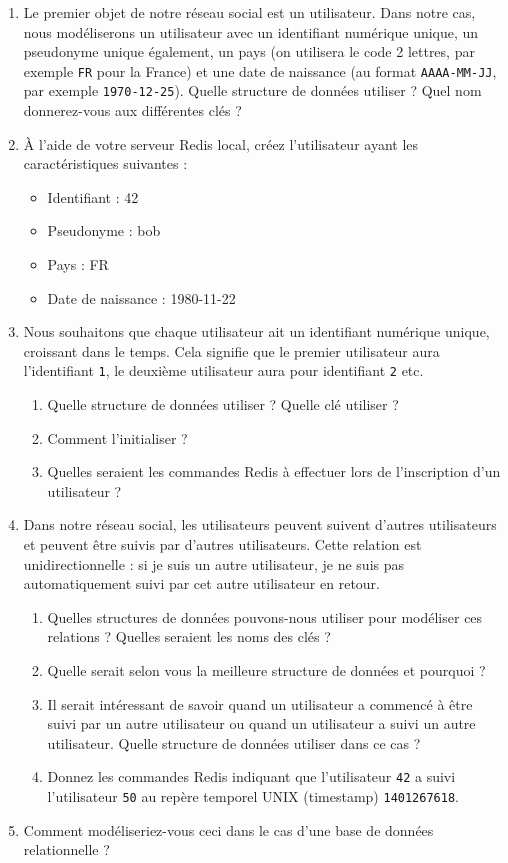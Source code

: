 \documentclass[a4paper,10pt]{article}
\begin{document}
    \begin{enumerate}
      \item Le premier objet de notre réseau social est un utilisateur. Dans notre cas, nous modéliserons un utilisateur avec un identifiant numérique unique, un pseudonyme unique également, un pays (on utilisera le code 2 lettres, par exemple \texttt{FR} pour la France) et une date de naissance (au format \texttt{AAAA-MM-JJ}, par exemple \texttt{1970-12-25}). Quelle structure de données utiliser ? Quel nom donnerez-vous aux différentes clés ?
      \item À l'aide de votre serveur Redis local, créez l'utilisateur ayant les caractéristiques suivantes :
        \begin{itemize}
          \item Identifiant : 42
          \item Pseudonyme : bob
          \item Pays : FR
          \item Date de naissance : 1980-11-22
        \end{itemize}
      \item Nous souhaitons que chaque utilisateur ait un identifiant numérique unique, croissant dans le temps. Cela signifie que le premier utilisateur aura l'identifiant \texttt{1}, le deuxième utilisateur aura pour identifiant \texttt{2} etc.
        \begin{enumerate}
          \item Quelle structure de données utiliser ? Quelle clé utiliser ?
          \item Comment l'initialiser ?
          \item Quelles seraient les commandes Redis à effectuer lors de l'inscription d'un utilisateur ?
        \end{enumerate}
      \item Dans notre réseau social, les utilisateurs peuvent suivent d'autres utilisateurs et peuvent être suivis par d'autres utilisateurs. Cette relation est unidirectionnelle : si je suis un autre utilisateur, je ne suis pas automatiquement suivi par cet autre utilisateur en retour.
        \begin{enumerate}
          \item Quelles structures de données pouvons-nous utiliser pour modéliser ces relations ? Quelles seraient les noms des clés ?
          \item Quelle serait selon vous la meilleure structure de données et pourquoi ?
          \item Il serait intéressant de savoir quand un utilisateur a commencé à être suivi par un autre utilisateur ou quand un utilisateur a suivi un autre utilisateur. Quelle structure de données utiliser dans ce cas ?
          \item Donnez les commandes Redis indiquant que l'utilisateur \texttt{42} a suivi l'utilisateur \texttt{50} au repère temporel UNIX (timestamp) \texttt{1401267618}.
        \end{enumerate}
      \item Comment modéliseriez-vous ceci dans le cas d'une base de données relationnelle ?
    \end{enumerate}
\end{document}
